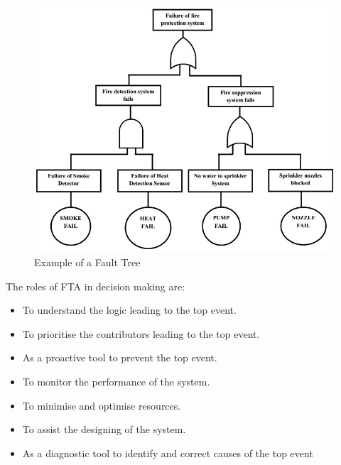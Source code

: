 \documentclass[10pt]{llncs}
\begin{document}
\begin{figure}[thpb]
      \centering
      
			\includegraphics[scale=0.4]{example_FT1}%
 	 
      \caption{Example of a Fault Tree}
      \label{fig3}
   \end{figure}	
	
The roles of FTA in decision making are\cite{Vesely2002}: 

\begin{itemize}
\item To understand the logic leading to the top event. 
\item To prioritise the contributors leading to the top event.
\item As a proactive tool to prevent the top event.
\item To monitor the performance of the system.
\item To minimise and optimise resources.
\item To assist the designing of the system.
\item As a diagnostic tool to identify and correct causes of the top event  
\end{itemize}
\end{document}
